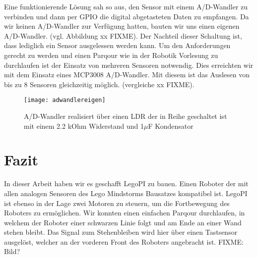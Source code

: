 Eine funktionierende Lösung sah so aus, den Sensor mit einem A/D-Wandler zu verbinden und dann per GPIO die digital abgetasteten Daten zu empfangen. Da wir keinen A/D-Wandler zur Verfügung hatten, bauten wir uns einen eigenen A/D-Wandler. (vgl. Abbildung xx FIXME). Der Nachteil dieser Schaltung ist, dass lediglich ein Sensor ausgelessen werden kann. Um den Anforderungen gerecht zu werden und einen Parqour wie in der Robotik Vorlesung zu durchlaufen ist der Einsatz von mehreren Sensoren notwendig. Dies erreichten wir mit dem Einsatz eines MCP3008 A/D-Wandler. Mit diesem ist das Auslesen von bis zu 8 Sensoren gleichzeitig möglich. (vergleiche xx FIXME).

\begin{figure}[h]
  \centering
  \texttt{[image: adwandlereigen]}
  \caption{A/D-Wandler realisiert über einen LDR der in Reihe geschaltet ist mit einem 2.2 kOhm Widerstand und 1$\mu$F Kondensator}
  \label{Kap1:Lightsensor}
\end{figure}


\chapter{Fazit}

In dieser Arbeit haben wir es geschafft LegoPI zu bauen. Einen Roboter der mit allen analogen Sensoren des Lego Mindstorms Bausatzes kompatibel ist. LegoPI ist ebenso in der Lage zwei Motoren zu steuern, um die Fortbewegung des Roboters zu ermöglichen. Wir konnten einen einfachen Parqour durchlaufen, in welchem der Roboter einer schwarzen Linie folgt und am Ende an einer Wand stehen bleibt. Das Signal zum Stehenbleiben wird hier über einen Tastsensor ausgelöst, welcher an der vorderen Front des Roboters angebracht ist. FIXME: Bild?




\blindtext[4]